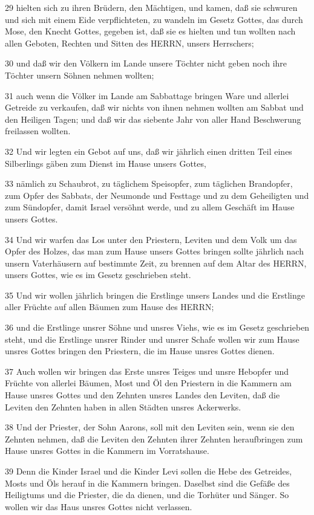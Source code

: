 \par 29 hielten sich zu ihren Brüdern, den Mächtigen, und kamen, daß sie schwuren und sich mit einem Eide verpflichteten, zu wandeln im Gesetz Gottes, das durch Mose, den Knecht Gottes, gegeben ist, daß sie es hielten und tun wollten nach allen Geboten, Rechten und Sitten des HERRN, unsers Herrschers;
\par 30 und daß wir den Völkern im Lande unsere Töchter nicht geben noch ihre Töchter unsern Söhnen nehmen wollten;
\par 31 auch wenn die Völker im Lande am Sabbattage bringen Ware und allerlei Getreide zu verkaufen, daß wir nichts von ihnen nehmen wollten am Sabbat und den Heiligen Tagen; und daß wir das siebente Jahr von aller Hand Beschwerung freilassen wollten.
\par 32 Und wir legten ein Gebot auf uns, daß wir jährlich einen dritten Teil eines Silberlings gäben zum Dienst im Hause unsers Gottes,
\par 33 nämlich zu Schaubrot, zu täglichem Speisopfer, zum täglichen Brandopfer, zum Opfer des Sabbats, der Neumonde und Festtage und zu dem Geheiligten und zum Sündopfer, damit Israel versöhnt werde, und zu allem Geschäft im Hause unsers Gottes.
\par 34 Und wir warfen das Los unter den Priestern, Leviten und dem Volk um das Opfer des Holzes, das man zum Hause unsers Gottes bringen sollte jährlich nach unsern Vaterhäusern auf bestimmte Zeit, zu brennen auf dem Altar des HERRN, unsers Gottes, wie es im Gesetz geschrieben steht.
\par 35 Und wir wollen jährlich bringen die Erstlinge unsers Landes und die Erstlinge aller Früchte auf allen Bäumen zum Hause des HERRN;
\par 36 und die Erstlinge unsrer Söhne und unsres Viehs, wie es im Gesetz geschrieben steht, und die Erstlinge unsrer Rinder und unsrer Schafe wollen wir zum Hause unsres Gottes bringen den Priestern, die im Hause unsres Gottes dienen.
\par 37 Auch wollen wir bringen das Erste unsres Teiges und unsre Hebopfer und Früchte von allerlei Bäumen, Most und Öl den Priestern in die Kammern am Hause unsres Gottes und den Zehnten unsres Landes den Leviten, daß die Leviten den Zehnten haben in allen Städten unsres Ackerwerks.
\par 38 Und der Priester, der Sohn Aarons, soll mit den Leviten sein, wenn sie den Zehnten nehmen, daß die Leviten den Zehnten ihrer Zehnten heraufbringen zum Hause unsres Gottes in die Kammern im Vorratshause.
\par 39 Denn die Kinder Israel und die Kinder Levi sollen die Hebe des Getreides, Mosts und Öls herauf in die Kammern bringen. Daselbst sind die Gefäße des Heiligtums und die Priester, die da dienen, und die Torhüter und Sänger. So wollen wir das Haus unsres Gottes nicht verlassen.

